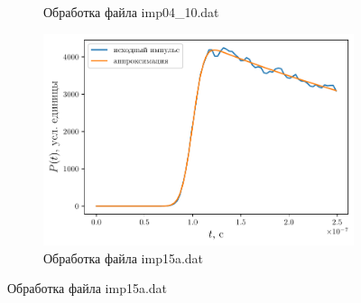 \begin{figure}[ht]
\begin{subfigure}{0.5\linewidth}
        \caption{Обработка файла imp04\_10.dat}
        \label{fig:}
    \end{subfigure}
    \begin{subfigure}{0.5\linewidth}
        \centering
        \includegraphics[width=\linewidth]{fig/retracking/imp_15a_3}
        \caption{Обработка файла imp15a.dat}
        \label{fig:}
    \end{subfigure}
\end{figure}
















